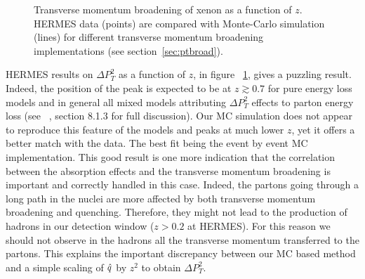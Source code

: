 \begin{figure}[tbp]
  \centering
{}
\caption {Transverse momentum broadening of xenon as a function of $z$. HERMES 
data \cite{Airapetian:2009jy} (points) are compared with Monte-Carlo simulation 
(lines) for different transverse momentum broadening implementations (see 
section~\ref{sec:ptbroad}).}
\label{fig:PtC-Ptz}
\end{figure}

HERMES results on $\Delta P_T^2$ as a function of $z$, in figure~%
\ref{fig:PtC-Ptz}, gives a puzzling result. Indeed, the position of the peak is 
expected to be at $z\gtrsim 0.7$ for pure energy loss models and in general all 
mixed models attributing $\Delta P_T^2$ effects to parton energy loss (see~%
\cite{Accardi:2009qv}, section 8.1.3 for full discussion). Our MC simulation 
does not appear to reproduce this feature of the models and peaks at much lower 
$z$, yet it offers a better match with the data. The best fit being the event 
by event MC implementation. This good result is one more indication that the 
correlation between the absorption effects and the transverse momentum 
broadening is important and correctly handled in this case. Indeed, the partons 
going through a long path in the nuclei are more affected by both transverse 
momentum broadening and quenching. Therefore, they might not lead to the 
production of hadrons in our detection window ($z>0.2$ at HERMES). For this 
reason we should not observe in the hadrons all the transverse momentum 
transferred to the partons. This explains the important discrepancy between our 
MC based method and a simple scaling of ${\hat q}$ by $z^2$ to obtain $\Delta 
P_T^2$.


